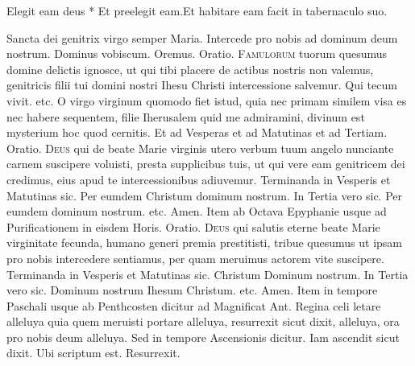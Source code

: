 \begin{multicols*}{2}
\begin{responsory-breve}
{Elegit eam deus * Et preelegit eam.}{Et habitare eam facit in tabernaculo suo.}
\end{responsory-breve}
\V Sancta dei genitrix virgo semper Maria. \R Intercede pro nobis ad dominum deum nostrum. Dominus vobiscum. {\color{Red} Oremus. Oratio.}
\lettrine[lines=2]{\zallmancaps \color{Blue} F}{amulorum} tuorum quesumus domine delictis ignosce, ut qui tibi placere de actibus nostris non valemus, genitricis filii tui domini nostri Ihesu Christi intercessione salvemur. Qui tecum vivit. etc.
 O virgo virginum quomodo fiet istud, quia nec primam similem visa es nec habere sequentem, filie Iherusalem quid me admiramini, divinum est mysterium hoc quod cernitis. {\color{Red} Et ad Vesperas et ad Matutinas et ad Tertiam. Oratio.}
\lettrine[lines=2]{\zallmancaps \color{Red} D}{eus} qui de beate Marie virginis utero verbum tuum angelo nunciante carnem suscipere voluisti, presta supplicibus tuis, ut qui vere eam genitricem dei credimus, eius apud te intercessionibus adiuvemur.
{\color{Red} Terminanda in Vesperis et Matutinas sic.} Per eumdem Christum dominum nostrum. {\color{Red} In Tertia vero sic.} Per eumdem dominum nostrum. etc. Amen. {\color{Red} Item ab Octava Epyphanie usque ad Purificationem in eisdem Horis. Oratio.}
\lettrine[lines=2]{\zallmancaps \color{Blue} D}{eus} qui salutis eterne beate Marie virginitate fecunda, humano generi premia prestitisti, tribue quesumus ut ipsam pro nobis intercedere sentiamus, per quam meruimus actorem vite suscipere.
{\color{Red} Terminanda in Vesperis et Matutinas sic.} Christum Dominum nostrum. {\color{Red} In Tertia vero sic.} Dominum nostrum Ihesum Christum. etc. Amen. {\color{Red} Item in tempore Paschali usque ab Penthcosten dicitur ad Magnificat Ant.} Regina celi letare alleluya quia quem meruisti portare alleluya, resurrexit sicut dixit, alleluya, ora pro nobis deum alleluya.
{\color{Red} Sed in tempore Ascensionis dicitur.} Iam ascendit sicut dixit. {\color{Red} Ubi scriptum est.} Resurrexit.



\end{multicols*}




